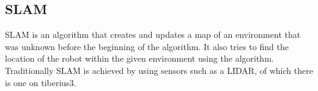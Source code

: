 \subsection{SLAM}
\gls{SLAM} is an algorithm that creates and updates a map of an environment that was unknown before the beginning of the algorithm. It also tries to find the location of the robot within the given environment using the algorithm. Traditionally \gls{SLAM} is achieved by using sensors such as a \gls{LIDAR}, of which there is one on \gls{tiberius3}.